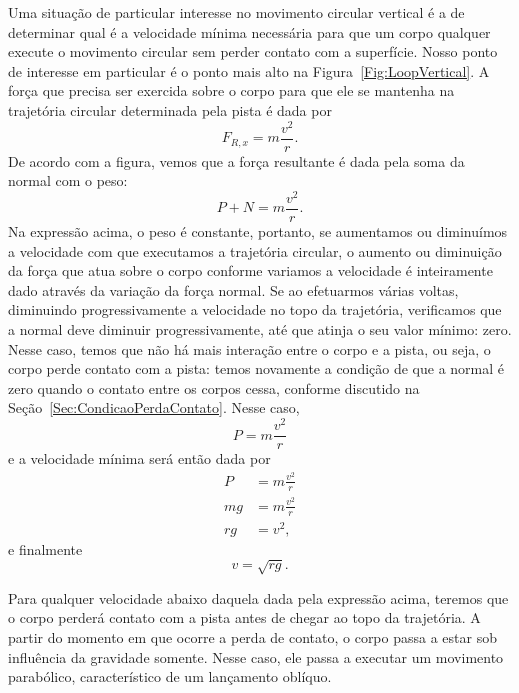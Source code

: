 Uma situação de particular interesse no movimento circular vertical é a de determinar qual é a velocidade mínima necessária para que um corpo qualquer execute o movimento circular sem perder contato com a superfície. Nosso ponto de interesse em particular é o ponto mais alto na Figura~\ref{Fig:LoopVertical}. A força que precisa ser exercida sobre o corpo para que ele se mantenha na trajetória circular determinada pela pista é dada por
\begin{equation}
    F_{R,x} = m \frac{v^2}{r}.
\end{equation}
%
De acordo com a figura, vemos que a força resultante é dada pela soma da normal com o peso:
\begin{equation}
    P + N = m\frac{v^2}{r}.
\end{equation}
%
Na expressão acima, o peso é constante, portanto, se aumentamos ou diminuímos a velocidade com que executamos a trajetória circular, o aumento ou diminuição da força que atua sobre o corpo conforme variamos a velocidade é inteiramente dado através da variação da força normal. Se ao efetuarmos várias voltas, diminuindo progressivamente a velocidade no topo da trajetória, verificamos que a normal deve diminuir progressivamente, até que atinja o seu valor mínimo: zero. Nesse caso, temos que não há mais interação entre o corpo e a pista, ou seja, o corpo perde contato com a pista: temos novamente a condição de que a normal é zero quando o contato entre os corpos cessa, conforme discutido na Seção~\ref{Sec:CondicaoPerdaContato}. Nesse caso,
\begin{equation}
    P = m \frac{v^2}{r}
\end{equation}
%
e a velocidade mínima será então dada por
\begin{align}
    P &= m\frac{v^2}{r} \\
    mg &= m\frac{v^2}{r} \\
    rg &= v^2,
\end{align}
%
e finalmente
\begin{equation}
    v = \sqrt{rg}.
\end{equation}

Para qualquer velocidade abaixo daquela dada pela expressão acima, teremos que o corpo perderá contato com a pista antes de chegar ao topo da trajetória. A partir do momento em que ocorre a perda de contato, o corpo passa a estar sob influência da gravidade somente. Nesse caso, ele passa a executar um movimento parabólico, característico de um lançamento oblíquo.

